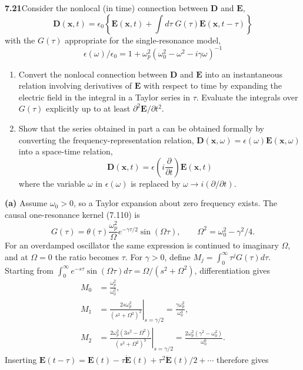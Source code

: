 \par\bigskip
\noindent\textbf{7.21}\quad Consider the nonlocal (in time) connection between $\mathbf{D}$ and $\mathbf{E}$,
\[
\mathbf{D}(\mathbf{x},t)=\epsilon_{0}\!\left\{\mathbf{E}(\mathbf{x},t)+\int d\tau\;G(\tau)\mathbf{E}(\mathbf{x},t-\tau)\right\}
\]
with the $G(\tau)$ appropriate for the single-resonance model,
\[
\epsilon(\omega)/\epsilon_{0}=1+\omega_{p}^{2}(\omega_{0}^{2}-\omega^{2}-i\gamma\omega)^{-1}
\]
\begin{enumerate}
\item[(a)] Convert the nonlocal connection between $\mathbf{D}$ and $\mathbf{E}$ into an instantaneous relation involving derivatives of $\mathbf{E}$ with respect to time by expanding the electric field in the integral in a Taylor series in $\tau$. Evaluate the integrals over $G(\tau)$ explicitly up to at least $\partial^{2}\mathbf{E}/\partial t^{2}$.
\item[(b)] Show that the series obtained in part a can be obtained formally by converting the frequency-representation relation, $\mathbf{D}(\mathbf{x},\omega)=\epsilon(\omega)\mathbf{E}(\mathbf{x},\omega)$ into a space-time relation,
\[
\mathbf{D}(\mathbf{x},t)=\epsilon\!\left(i\frac{\partial}{\partial t}\right)\!\mathbf{E}(\mathbf{x},t)
\]
where the variable $\omega$ in $\epsilon(\omega)$ is replaced by $\omega\to i(\partial/\partial t)$.
\end{enumerate}
\solution
\textbf{(a)} Assume $\omega_0>0$, so a Taylor expansion about
zero frequency exists.  The causal one-resonance kernel (7.110) is
\[
G(\tau)=\theta(\tau)\frac{\omega_p^2}{\Omega}
 e^{-\gamma\tau/2}\sin(\Omega\tau),\qquad
\Omega^2=\omega_0^2-\gamma^2/4.
\]
For an overdamped oscillator the same expression is continued to
imaginary $\Omega$, and at $\Omega=0$ the ratio becomes $\tau$.
For $\gamma>0$, define $M_j=\int_0^\infty\tau^jG(\tau)d\tau$.
Starting from
$\int_0^\infty e^{-s\tau}\sin(\Omega\tau)d\tau
=\Omega/(s^2+\Omega^2)$, differentiation gives
\begin{align*}
M_0&=\frac{\omega_p^2}{\omega_0^2},\\
M_1&=\left.\frac{2s\omega_p^2}{(s^2+\Omega^2)^2}\right|_{s=\gamma/2}
=\frac{\gamma\omega_p^2}{\omega_0^4},\\
M_2&=\left.\frac{2\omega_p^2(3s^2-\Omega^2)}{(s^2+\Omega^2)^3}
\right|_{s=\gamma/2}
=\frac{2\omega_p^2(\gamma^2-\omega_0^2)}{\omega_0^6}.
\end{align*}
Inserting $\mathbf E(t-\tau)=\mathbf E(t)-\tau\dot{\mathbf E}(t)
+\tau^2\ddot{\mathbf E}(t)/2+\cdots$ therefore gives
